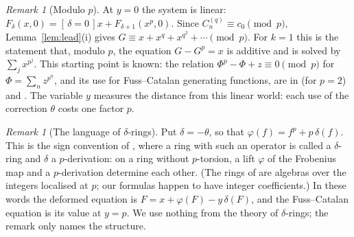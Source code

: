 \documentclass[11pt]{article}
\theoremstyle{definition}
\theoremstyle{remark}
\newtheorem{remark}[theorem]{Remark}
\newcommand{\C}{C_n^{(q)}}
\newcommand{\br}[1]{[\,#1\,]}
\begin{document}
\begin{remark}[Modulo $p$]
At $y=0$ the system is linear: $F_\delta(x,0)=\br{\delta=0}x+F_{\delta+1}(x^p,0)$. Since
$\C\equiv c_0\pmod p$, Lemma~\ref{lem:lead}(i) gives $G\equiv x+x^{q}+x^{q^2}+\cdots\pmod p$.
For $k=1$ this is the statement that, modulo $p$, the equation $G-G^p=x$ is additive and is
solved by $\sum_jx^{p^j}$. This starting point is known: the relation
$\Phi^p-\Phi+z\equiv0\pmod p$ for $\Phi=\sum_nz^{p^n}$, and its use for Fuss--Catalan
generating functions, are in \cite{KKM} (for $p=2$) and \cite{KM}. The variable $y$ measures
the distance from this linear world: each use of the correction $\theta$ costs one factor $p$.
\end{remark}

\begin{remark}[The language of $\delta$-rings]
Put $\delta=-\theta$, so that $\varphi(f)=f^p+p\,\delta(f)$. This is the sign convention of
\cite[Definition~2.1 and Remark~2.2]{BS}, where a ring with such an operator is called a
$\delta$-ring and $\delta$ a $p$-derivation: on a ring without $p$-torsion, a lift $\varphi$
of the Frobenius map and a $p$-derivation determine each other. (The rings of \cite{BS} are
algebras over the integers localised at $p$; our formulas happen to have integer
coefficients.) In these words the deformed equation is
$F=x+\varphi(F)-y\,\delta(F)$, and the Fuss--Catalan equation is its value at $y=p$. We use
nothing from the theory of $\delta$-rings; the remark only names the structure.
\end{remark}
\end{document}
